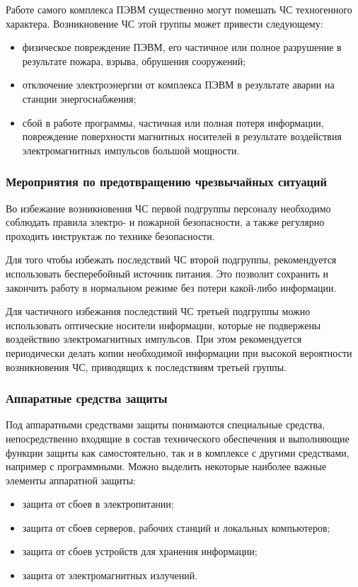 Работе самого комплекса ПЭВМ существенно могут помешать ЧС техногенного характера.
Возникновение ЧС этой группы может привести следующему:
\begin{itemize}
  \item физическое повреждение ПЭВМ, его частичное или полное разрушение в результате пожара, взрыва, обрушения сооружений;
  \item отключение электроэнергии от комплекса ПЭВМ в результате аварии на станции энергоснабжения;
  \item сбой в работе программы, частичная или полная потеря информации, повреждение поверхности магнитных носителей в результате воздействия электромагнитных импульсов большой мощности.
\end{itemize}

\subsubsection{Мероприятия по предотвращению чрезвычайных ситуаций}
Во избежание возникновения ЧС первой подгруппы персоналу необходимо соблюдать правила электро- и пожарной безопасности, а также регулярно проходить инструктаж по технике безопасности.

Для того чтобы избежать последствий ЧС второй подгруппы, рекомендуется использовать бесперебойный источник питания. Это позволит сохранить и закончить работу в нормальном режиме без потери какой-либо информации.

Для частичного избежания последствий ЧС третьей подгруппы можно использовать оптические носители информации, которые не подвержены воздействию электромагнитных импульсов.
При этом рекомендуется периодически делать копии необходимой информации при высокой вероятности возникновения ЧС, приводящих к последствиям третьей группы.

\subsubsection{Аппаратные средства защиты}

Под аппаратными средствами защиты понимаются специальные средства, непосредственно входящие в состав технического обеспечения и выполняющие функции защиты как самостоятельно, так и в комплексе с другими средствами, например с программными.
Можно выделить некоторые наиболее важные элементы аппаратной защиты:
\begin{itemize}
  \item защита от сбоев в электропитании;
  \item защита от сбоев серверов, рабочих станций и локальных компьютеров;
  \item защита от сбоев устройств для хранения информации;
  \item защита от электромагнитных излучений.
\end{itemize}


